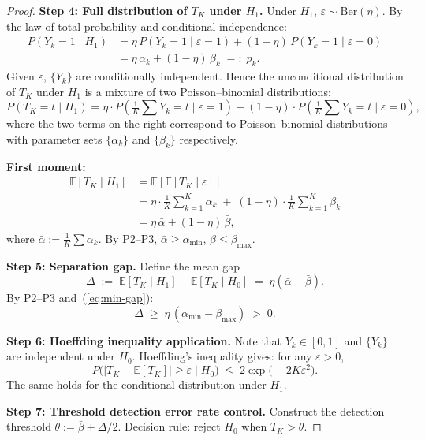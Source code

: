 \documentclass[12pt,a4paper]{article}
\newcommand{\E}{\mathbb{E}}
\newcommand{\Ber}{\mathrm{Ber}}
\newcommand{\gap}{\Delta}
\begin{document}
\begin{proof}
\textbf{Step 4: Full distribution of $T_K$ under $H_1$.}
Under $H_1$, $\varepsilon\sim\Ber(\eta)$. By the law of total probability and conditional independence:
\begin{align*}
    P(Y_k=1\mid H_1)
    &= \eta\,P(Y_k=1\mid\varepsilon=1) + (1-\eta)\,P(Y_k=1\mid\varepsilon=0) \\
    &= \eta\,\alpha_k + (1-\eta)\,\beta_k \;=:\; p_k.
\end{align*}
Given $\varepsilon$, $\{Y_k\}$ are conditionally independent. Hence the unconditional distribution of $T_K$ under $H_1$ is a mixture of two Poisson--binomial distributions:
\[
P(T_K = t \mid H_1) = \eta\cdot P\!\left(\tfrac1K\sum Y_k = t \;\big|\; \varepsilon=1\right)
+ (1-\eta)\cdot P\!\left(\tfrac1K\sum Y_k = t \;\big|\; \varepsilon=0\right),
\]
where the two terms on the right correspond to Poisson--binomial distributions with parameter sets $\{\alpha_k\}$ and $\{\beta_k\}$ respectively.

\textbf{First moment:}
\begin{align*}
    \E[T_K \mid H_1]
    &= \E[\E[T_K\mid\varepsilon]] \\
    &= \eta\cdot\frac{1}{K}\sum_{k=1}^{K}\alpha_k \;+\; (1-\eta)\cdot\frac{1}{K}\sum_{k=1}^{K}\beta_k \\
    &= \eta\,\bar{\alpha} + (1-\eta)\,\bar{\beta},
\end{align*}
where $\bar{\alpha}:=\frac1K\sum\alpha_k$. By P2--P3,
$\bar{\alpha}\geq\alpha_{\min}$, $\bar{\beta}\leq\beta_{\max}$.

\textbf{Step 5: Separation gap.}
Define the mean gap
\[
\gap \;:=\; \E[T_K\mid H_1] - \E[T_K\mid H_0] \;=\; \eta(\bar{\alpha}-\bar{\beta}).
\]
By P2--P3 and~(\ref{eq:min-gap}):
\[
\gap \;\geq\; \eta\,(\alpha_{\min} - \beta_{\max}) \;>\; 0.
\]

\textbf{Step 6: Hoeffding inequality application.}
Note that $Y_k\in[0,1]$ and $\{Y_k\}$ are independent under $H_0$. Hoeffding's inequality
\citep{hoeffding1963probability} gives: for any $\varepsilon>0$,
\begin{equation}\label{eq:hoeffding}
    P\bigl(|T_K - \E[T_K]| \geq \varepsilon \;\big|\; H_0\bigr)
    \;\leq\; 2\exp\!\bigl(-2K\varepsilon^{2}\bigr).
\end{equation}
The same holds for the conditional distribution under $H_1$.

\textbf{Step 7: Threshold detection error rate control.}
Construct the detection threshold $\theta := \bar{\beta} + \gap/2$. Decision rule: reject $H_0$ when $T_K > \theta$.


\end{proof}
\end{document}
